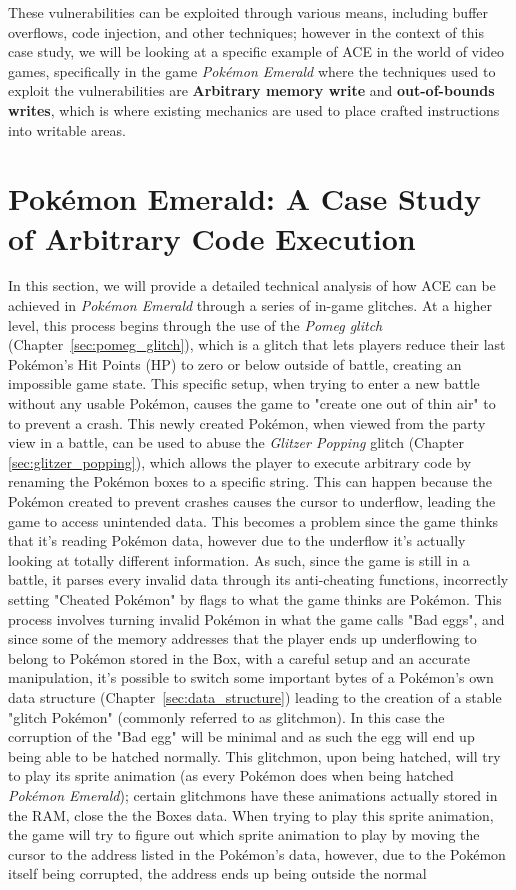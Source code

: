 \documentclass[a4paper]{usiinfbachelorproject}
\begin{document}
These vulnerabilities can be exploited through various means, including buffer overflows, code injection, and other techniques; however in the context of this case study, we will be looking at a specific example of ACE in the world of video games, specifically in the game \textit{Pokémon Emerald} where the techniques used to exploit the vulnerabilities are \textbf{Arbitrary memory write} and \textbf{out-of-bounds writes}, which is where existing mechanics are used to place crafted instructions into writable areas.




\section{Pokémon Emerald: A Case Study of Arbitrary Code Execution}
\label{sec:case_study}
In this section, we will provide a detailed technical analysis of how ACE can be achieved in \textit{Pokémon Emerald} through a series of in-game glitches. At a higher level, this process begins through the use of the \textit{Pomeg glitch} (Chapter~\ref{sec:pomeg_glitch}), which is a glitch that lets players reduce their last Pokémon’s Hit Points (HP) to zero or below outside of battle, creating an impossible game state. This specific setup, when trying to enter a new battle without any usable Pokémon, causes the game to "create one out of thin air" to to prevent a crash. This newly created Pokémon, when viewed from the party view in a battle, can be used to abuse the \textit{Glitzer Popping} glitch (Chapter \ref{sec:glitzer_popping}), which allows the player to execute arbitrary code by renaming the Pokémon boxes to a specific string. This can happen because the Pokémon created to prevent crashes causes the cursor to underflow, leading the game to access unintended data. This becomes a problem since the game thinks that it's reading Pokémon data, however due to the underflow it's actually looking at totally different information. As such, since the game is still in a battle, it parses every invalid data through its anti-cheating functions, incorrectly setting "Cheated Pokémon" by flags to what the game thinks are Pokémon. This process involves turning invalid Pokémon in what the game calls "Bad eggs", and since some of the memory addresses that the player ends up underflowing to belong to Pokémon stored in the Box, with a careful setup and an accurate manipulation, it's possible to switch some important bytes of a Pokémon's own data structure (Chapter~\ref{sec:data_structure}) leading to the creation of a stable "glitch Pokémon" (commonly referred to as glitchmon). In this case the corruption of the "Bad egg" will be minimal and as such the egg will end up being able to be hatched normally. This glitchmon, upon being hatched, will try to play its sprite animation (as every Pokémon does when being hatched \textit{Pokémon Emerald}); certain glitchmons have these animations actually stored in the RAM, close the the Boxes data. When trying to play this sprite animation, the game will try to figure out which sprite animation to play by moving the cursor to the address listed in the Pokémon's data, however, due to the Pokémon itself being corrupted, the address ends up being outside the normal 
\end{document}
